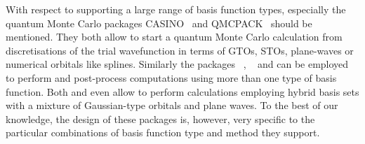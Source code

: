 With respect to supporting a large range of basis function types,
especially the quantum Monte Carlo packages CASINO~\cite{Needs2010}
and QMCPACK~\cite{Kim2012} should be mentioned.
They both allow to start a quantum Monte Carlo calculation
from discretisations of the trial wavefunction
in terms of GTOs, STOs, plane-waves or numerical orbitals like splines.
Similarly the packages \CPtK~\cite{Hutter2014}, \ASE~\cite{Larsen2017}
and \gpaw can be employed to perform and post-process computations
using more than one type of basis function.
Both \gpaw and \CPtK even allow to perform calculations
employing hybrid basis sets with a mixture of
Gaussian-type orbitals and plane waves.
To the best of our knowledge,
the design of these packages is, however,
very specific to the particular combinations of basis function type
and method they support.

